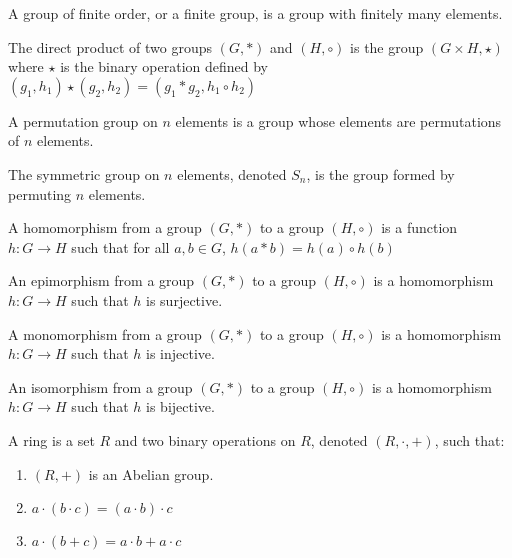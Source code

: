         \begin{definition}
            A group of finite order, or a finite group,
            is a group with finitely many elements.
        \end{definition}
        \begin{definition}
            The direct product of two groups $(G,*)$ and
            $(H,\circ)$ is the group  $({G}\times{H},\star)$
            where $\star$ is the binary operation defined by
            $(g_{1},h_{1})\star(g_{2},h_{2})%
             =(g_{1}*g_{2},{h_{1}}\circ{h_{2}})$
        \end{definition}
        \begin{definition}
            A permutation group on $n$ elements is a
            group whose elements are permutations of
            $n$ elements.
        \end{definition}
        \begin{definition}
            The symmetric group on $n$ elements,
            denoted $S_{n}$, is the group formed by
            permuting $n$ elements.
        \end{definition}
        \begin{definition}
            A homomorphism from a group $(G,*)$ to
            a group $(H,\circ)$ is a function
            $h:{G}\rightarrow{H}$ such that for all
            ${a,b}\in{G}$, $h(a*b)={h(a)}\circ{h(b)}$
        \end{definition}
        \begin{definition}
            An epimorphism from a group $(G,*)$ to
            a group $(H,\circ)$ is a homomorphism
            $h:{G}\rightarrow{H}$ such that
            $h$ is surjective.
        \end{definition}
        \begin{definition}
            A monomorphism from a group $(G,*)$ to
            a group $(H,\circ)$ is a homomorphism
            $h:{G}\rightarrow{H}$ such that
            $h$ is injective.
        \end{definition}
        \begin{definition}
            An isomorphism from a group $(G,*)$ to
            a group $(H,\circ)$ is a homomorphism
            $h:{G}\rightarrow{H}$ such that
            $h$ is bijective.
        \end{definition}
        \begin{definition}
            A ring is a set $R$ and two binary operations
            on $R$, denoted $(R,\cdot,+)$, such that:
            \begin{enumerate}
                \item $(R,+)$ is an Abelian group.
                \item $a\cdot({b}\cdot{c})=({a}\cdot{b})\cdot{c}$
                \item ${a}\cdot(b+c)={a}\cdot{b}+{a}\cdot{c}$
            \end{enumerate}
        \end{definition}
